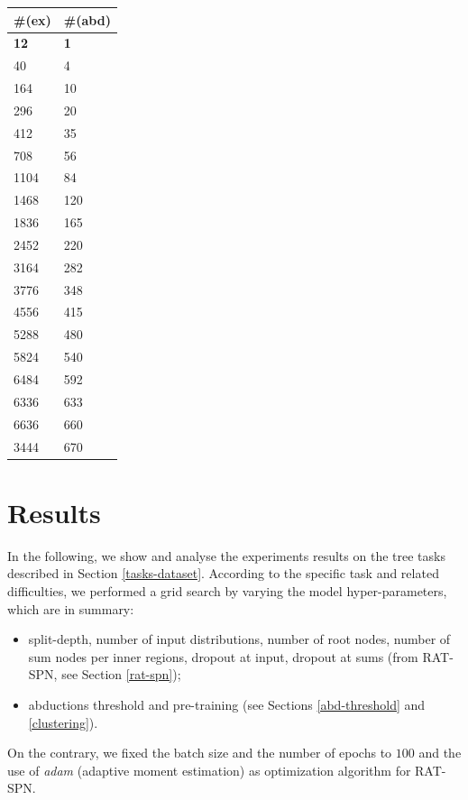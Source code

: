 \begin{table}[H]
\begin{tabular}[t]{ll}
    \toprule
    \#(ex)	& \#(abd)\\
    \midrule
    \textbf{12}		& \textbf{1}\\
    40				& 4\\
	164				& 10\\
	296				& 20\\
	412				& 35\\
	708				& 56\\
	1104			& 84\\
	1468			& 120\\
	1836			& 165\\
	2452			& 220\\
	3164			& 282\\
	3776			& 348\\
	4556			& 415\\
	5288			& 480\\
	5824			& 540\\
	6484			& 592\\
	6336			& 633\\
	6636			& 660\\
	3444			& 670\\
    \bottomrule
  \end{tabular}
\end{table}

\section{Results}
\label{results}
In the following, we show and analyse the experiments results on the tree tasks described in Section \ref{tasks-dataset}. According to the specific task and related difficulties, we performed a grid search by varying the model hyper-parameters, which are in summary:

\begin{itemize}
	\item split-depth, number of input distributions, number of root nodes, number of sum nodes per inner regions, dropout at input, dropout at sums (from RAT-SPN, see Section \ref{rat-spn});
	\item abductions threshold and pre-training (see Sections \ref{abd-threshold} and \ref{clustering}).
\end{itemize}
On the contrary, we fixed the batch size and the number of epochs to $100$ and the use of \textit{adam} (adaptive moment estimation) \cite{kingma2017adam} as optimization algorithm for RAT-SPN.

